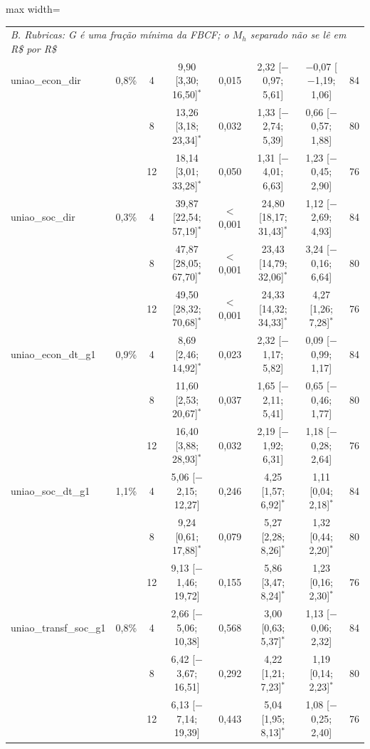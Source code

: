\begin{table}[htbp]
\begin{adjustbox}{max width=\linewidth}
\begin{tabular}{lccccccc}
\multicolumn{8}{l}{\textit{B. Rubricas: G \'e uma fra\c{c}\~ao m\'inima da FBCF; o $M_h$ separado n\~ao se l\^e em R\$ por R\$}} \\
uniao\_econ\_dir & 0{,}8\% & 4 & 9{,}90 [3{,}30; 16{,}50]$^{*}$ & 0{,}015 & 2{,}32 [$-$0{,}97; 5{,}61] & $-$0{,}07 [$-$1{,}19; 1{,}06] & 84 \\
 &  & 8 & 13{,}26 [3{,}18; 23{,}34]$^{*}$ & 0{,}032 & 1{,}33 [$-$2{,}74; 5{,}39] & 0{,}66 [$-$0{,}57; 1{,}88] & 80 \\
 &  & 12 & 18{,}14 [3{,}01; 33{,}28]$^{*}$ & 0{,}050 & 1{,}31 [$-$4{,}01; 6{,}63] & 1{,}23 [$-$0{,}45; 2{,}90] & 76 \\
uniao\_soc\_dir & 0{,}3\% & 4 & 39{,}87 [22{,}54; 57{,}19]$^{*}$ & $<$0{,}001 & 24{,}80 [18{,}17; 31{,}43]$^{*}$ & 1{,}12 [$-$2{,}69; 4{,}93] & 84 \\
 &  & 8 & 47{,}87 [28{,}05; 67{,}70]$^{*}$ & $<$0{,}001 & 23{,}43 [14{,}79; 32{,}06]$^{*}$ & 3{,}24 [$-$0{,}16; 6{,}64] & 80 \\
 &  & 12 & 49{,}50 [28{,}32; 70{,}68]$^{*}$ & $<$0{,}001 & 24{,}33 [14{,}32; 34{,}33]$^{*}$ & 4{,}27 [1{,}26; 7{,}28]$^{*}$ & 76 \\
uniao\_econ\_dt\_g1 & 0{,}9\% & 4 & 8{,}69 [2{,}46; 14{,}92]$^{*}$ & 0{,}023 & 2{,}32 [$-$1{,}17; 5{,}82] & 0{,}09 [$-$0{,}99; 1{,}17] & 84 \\
 &  & 8 & 11{,}60 [2{,}53; 20{,}67]$^{*}$ & 0{,}037 & 1{,}65 [$-$2{,}11; 5{,}41] & 0{,}65 [$-$0{,}46; 1{,}77] & 80 \\
 &  & 12 & 16{,}40 [3{,}88; 28{,}93]$^{*}$ & 0{,}032 & 2{,}19 [$-$1{,}92; 6{,}31] & 1{,}18 [$-$0{,}28; 2{,}64] & 76 \\
uniao\_soc\_dt\_g1 & 1{,}1\% & 4 & 5{,}06 [$-$2{,}15; 12{,}27] & 0{,}246 & 4{,}25 [1{,}57; 6{,}92]$^{*}$ & 1{,}11 [0{,}04; 2{,}18]$^{*}$ & 84 \\
 &  & 8 & 9{,}24 [0{,}61; 17{,}88]$^{*}$ & 0{,}079 & 5{,}27 [2{,}28; 8{,}26]$^{*}$ & 1{,}32 [0{,}44; 2{,}20]$^{*}$ & 80 \\
 &  & 12 & 9{,}13 [$-$1{,}46; 19{,}72] & 0{,}155 & 5{,}86 [3{,}47; 8{,}24]$^{*}$ & 1{,}23 [0{,}16; 2{,}30]$^{*}$ & 76 \\
uniao\_transf\_soc\_g1 & 0{,}8\% & 4 & 2{,}66 [$-$5{,}06; 10{,}38] & 0{,}568 & 3{,}00 [0{,}63; 5{,}37]$^{*}$ & 1{,}13 [$-$0{,}06; 2{,}32] & 84 \\
 &  & 8 & 6{,}42 [$-$3{,}67; 16{,}51] & 0{,}292 & 4{,}22 [1{,}21; 7{,}23]$^{*}$ & 1{,}19 [0{,}14; 2{,}23]$^{*}$ & 80 \\
 &  & 12 & 6{,}13 [$-$7{,}14; 19{,}39] & 0{,}443 & 5{,}04 [1{,}95; 8{,}13]$^{*}$ & 1{,}08 [$-$0{,}25; 2{,}40] & 76 \\

\end{tabular}
\end{adjustbox}
\end{table}
